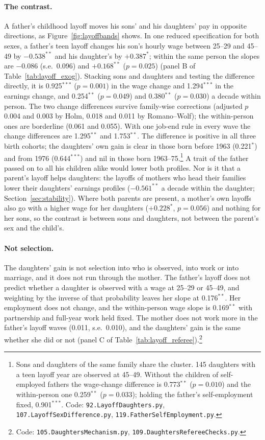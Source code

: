 \paragraph{The contrast.} A father's childhood layoff moves his sons' and his daughters' pay in opposite directions, as
Figure~\ref{fig:layoffbands} shows. In one reduced specification for both sexes, a father's teen layoff changes his
son's hourly wage between 25--29 and 45--49 by $-0.538^{**}$ and his daughter's by $+0.387^{*}$; within the same person
the slopes are $-0.086$ (s.e.\ 0.096) and $+0.168^{**}$ ($p = 0.025$) (panel B of Table~\ref{tab:layoff_exog}).
Stacking sons and daughters and testing the difference directly, it is 0.925$^{***}$ ($p = 0.001$) in the wage change and
1.294$^{***}$ in the earnings change, and 0.254$^{**}$ ($p = 0.049$) and 0.380$^{**}$ ($p = 0.030$) a decade within
person. The two change differences survive family-wise corrections (adjusted $p$ 0.004 and 0.003 by Holm, 0.018 and
0.011 by Romano--Wolf); the within-person ones are borderline (0.061 and 0.055). With one job-end rule in every wave the change differences are 1.295$^{**}$ and 1.753$^{**}$. The
difference is positive in all three birth cohorts; the daughters' own gain is clear in those born before 1963
(0.221$^{*}$) and from 1976 (0.644$^{***}$) and nil in those born 1963--75.\footnote{Sons and daughters of the same family
share the cluster. 145 daughters with a teen layoff year are observed at 45--49. Without the children of self-employed
fathers the wage-change difference is 0.773$^{**}$ ($p = 0.010$) and the within-person one 0.259$^{**}$ ($p = 0.033$);
holding the father's self-employment fixed, 0.901$^{***}$. Code: \texttt{92.LayoffDaughters.py},
\texttt{107.LayoffSexDifference.py}, \texttt{119.FatherSelfEmployment.py}.} A trait of the father passed on to all his children alike would lower both profiles. Nor is it that a parent's layoff
helps daughters: the layoffs of mothers who head their families lower their daughters' earnings profiles
($-0.561^{**}$ a decade within the daughter; Section~\ref{sec:stability}). Where both parents are present, a mother's own layoffs also go
with a higher wage for her daughters ($+0.228^{*}$, $p = 0.056$) and nothing for her sons, so the contrast is between
sons and daughters, not between the parent's sex and the child's.

\paragraph{Not selection.} The daughters' gain is not selection into who is observed, into work or into marriage, and it
does not run through the mother. The father's layoff does not predict whether a daughter is observed with a wage at
25--29 or 45--49, and weighting by the inverse of that probability leaves her slope at 0.176$^{**}$. Her employment does
not change, and the within-person wage slope is 0.169$^{**}$ with partnership and full-year work held fixed. The mother
does not work more in the father's layoff waves (0.011, s.e.\ 0.010), and the daughters' gain is the same whether she did
or not (panel C of Table~\ref{tab:layoff_referee}).\footnote{Code: \texttt{105.DaughtersMechanism.py},
\texttt{109.DaughtersRefereeChecks.py}.}

